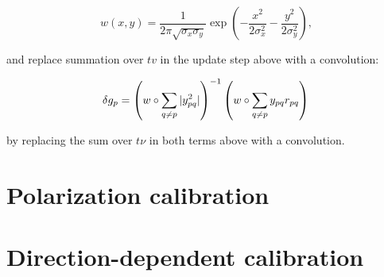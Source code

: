 \documentclass[useAMS,usenatbib]{mn2e}
\begin{document}
\[
w(x,y) = \frac{1}{2\pi\sqrt{\sigma_x\sigma_y}} \exp\left( -\frac{x^2}{2\sigma^2_x} - \frac{y^2}{2\sigma_y^2} \right),
\]

and replace summation over $tv$ in the update step above with a convolution:

\begin{equation}
\label{eq:JHJ:diag:smooth}
\delta g_p = \left( w\circ\sum\limits_{q\ne p} |y^2_{pq}| \right )^{-1} \left( w\circ \sum\limits_{q\ne p} y_{pq} r_{pq} \right )\\
\end{equation}




 by replacing the sum over $t\nu$ in both terms above with a convolution.

\section{Polarization calibration}

\section{Direction-dependent calibration}






\label{lastpage}
\end{document}

